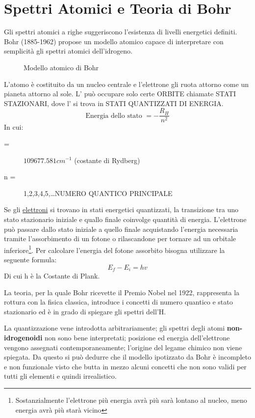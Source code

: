 \section{Spettri Atomici e Teoria di Bohr}
\label{sec:atomodiBohr}
\begin{defi}
  Gli spettri atomici a righe suggeriscono l'esistenza di livelli energetici definiti. Bohr (1885-1962) propose un modello atomico capace di interpretare con semplicità gli spettri atomici dell'idrogeno.
  \begin{figure}[ht!]
    \centering  
    \caption{Modello atomico di Bohr}
    \label{fig:Modatombohr}
  \end{figure}

  L'atomo è costituito da un nucleo centrale e l'elettrone gli ruota attorno come un pianeta attorno
  al sole. L' può occupare solo certe ORBITE chiamate STATI STAZIONARI, dove l' si trova in STATI
  QUANTIZZATI DI ENERGIA.
  \begin{equation}
    \label{eq:energiastato}
    \text{Energia dello stato } = -\frac{R_H}{n^2}
  \end{equation}
  In cui:
  \begin{description}
  \item[ =] $109677.581cm^{-1}$ (costante di Rydberg)
  \item[n =] 1,2,3,4,5,\dots NUMERO QUANTICO PRINCIPALE
  \end{description}
  Se gli \underline{elettroni} si trovano in stati energetici quantizzati, la transizione tra uno stato stazionario
  iniziale e quallo finale coinvolge quantità di energia. L'elettrone può passare dallo stato iniziale a quello
  finale {\color{blue}acquistando l'energia necessaria tramite l'assorbimento di un fotone o rilascandone per
    tornare ad un orbitale inferiore}\footnote{Sostanzialmente l'elettrone più energia avrà più sarà lontano al
    nucleo, meno energia avrà più starà vicino}.
  Per calcolare l'energia del fotone assorbito bisogna utilizzare la seguente formula:
  \begin{equation}
    \label{eq:energiafotoneassorbito}
    E_f-E_i=hv
  \end{equation}
  Di cui h è la Costante di Plank. 
\end{defi}
\begin{nota}
  La teoria, per la quale Bohr ricevette il Premio Nobel nel 1922, rappresenta la rottura con la fisica classica,
  introduce i concetti di numero quantico e stato stazionario ed è in grado di spiegare gli spettri dell’H.
\end{nota}
\begin{oss}
  La quantizzazione vene introdotta arbitrariamente; gli spettri degli atomi \textbf{non-idrogenoidi} non sono
  bene interpretati; posizione ed energia dell'elettrone vengono assegnati contemporaneamente; l'origine del legame
  chimico non viene spiegata. Da questo si può dedurre che il modello ipotizzato da Bohr è incompleto e non
  funzionale visto che butta in mezzo alcuni concetti che non sono validi per tutti gli elementi e quindi
  irrealistico.
\end{oss}

